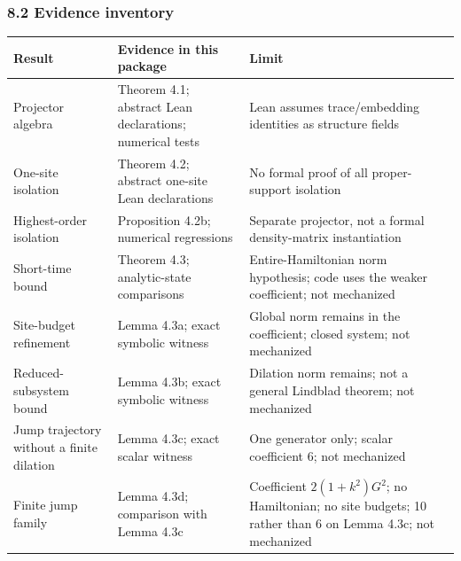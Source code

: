 \documentclass[
  11pt,
]{article}
\begin{document}
\subsubsection{8.2 Evidence inventory}\label{evidence-inventory}

\begin{longtable}[]{@{}
  >{\raggedright\arraybackslash}p{}
  >{\raggedright\arraybackslash}p{}
  >{\raggedright\arraybackslash}p{}@{}}
\toprule\noalign{}
\begin{minipage}[b]{\linewidth}\raggedright
Result
\end{minipage} & \begin{minipage}[b]{\linewidth}\raggedright
Evidence in this package
\end{minipage} & \begin{minipage}[b]{\linewidth}\raggedright
Limit
\end{minipage} \\
\midrule\noalign{}
\endhead
\bottomrule\noalign{}
\endlastfoot
Projector algebra & Theorem 4.1; abstract Lean declarations; numerical tests & Lean assumes trace/embedding identities as structure fields \\
One-site isolation & Theorem 4.2; abstract one-site Lean declarations & No formal proof of all proper-support isolation \\
Highest-order isolation & Proposition 4.2b; numerical regressions & Separate projector, not a formal density-matrix instantiation \\
Short-time bound & Theorem 4.3; analytic-state comparisons & Entire-Hamiltonian norm hypothesis; code uses the weaker coefficient; not mechanized \\
Site-budget refinement & Lemma 4.3a; exact symbolic witness & Global norm remains in the coefficient; closed system; not mechanized \\
Reduced-subsystem bound & Lemma 4.3b; exact symbolic witness & Dilation norm remains; not a general Lindblad theorem; not mechanized \\
Jump trajectory without a finite dilation & Lemma 4.3c; exact scalar witness & One generator only; scalar coefficient 6; not mechanized \\
Finite jump family & Lemma 4.3d; comparison with Lemma 4.3c & Coefficient \(2(1+k^2)G^2\); no Hamiltonian; no site budgets; 10 rather than 6 on Lemma 4.3c; not mechanized \\

\end{longtable}
\end{document}
